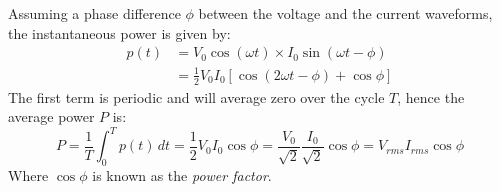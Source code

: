 Assuming a phase difference $\phi$ between the voltage and the current waveforms, the instantaneous power is given by:
\begin{align}
p(t) & = V_0 \cos(\omega t) \times I_0 \sin(\omega t - \phi)\\
     & = \frac{1}{2}V_0I_0\left[\cos(2\omega t -\phi) + \cos\phi\right]
\end{align} 
The first term is periodic and will average zero over the cycle $T$, hence the average power $P$ is:
\begin{equation}
P = \frac{1}{T}\int_0^Tp(t)\,dt = \frac{1}{2}V_0I_0\cos\phi =\frac{V_0}{\sqrt{2}} \frac{I_0}{\sqrt{2}}\cos\phi=V_{rms}I_{rms}\cos\phi
\end{equation}
Where $\cos\phi$ is known as the \emph{power factor}.